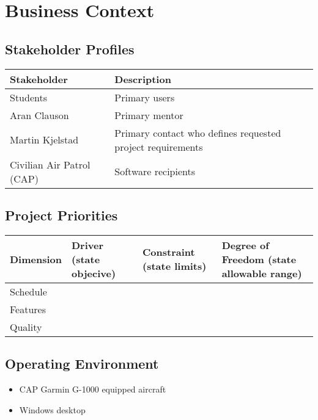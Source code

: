\documentclass[12pt, letterpaper]{article}
\begin{document}
\section{Business Context}
\subsection{Stakeholder Profiles}

\begin{tabular}{ |l|l| }
\hline
Stakeholder & Description \\ \hline \hline
Students & Primary users \\ \hline
Aran Clauson & Primary mentor \\ \hline
Martin Kjelstad & Primary contact who defines requested project requirements \\ \hline
Civilian Air Patrol (CAP) & Software recipients \\ \hline
\hline
\end{tabular}

\subsection{Project Priorities}

\begin{tabular} { |l|l|l|l| }
\hline
Dimension & Driver \newline (state objecive) & Constraint \newline(state limits) & Degree of Freedom \newline(state allowable range) \\
\hline
\hline
Schedule & & & \\ \hline
Features & & & \\ \hline
Quality & & & \\
\hline
\end{tabular}

\subsection{Operating Environment}

\begin{itemize}
	\item CAP Garmin G-1000 equipped aircraft
	\item Windows desktop
\end{itemize}

{}

\end{document}
